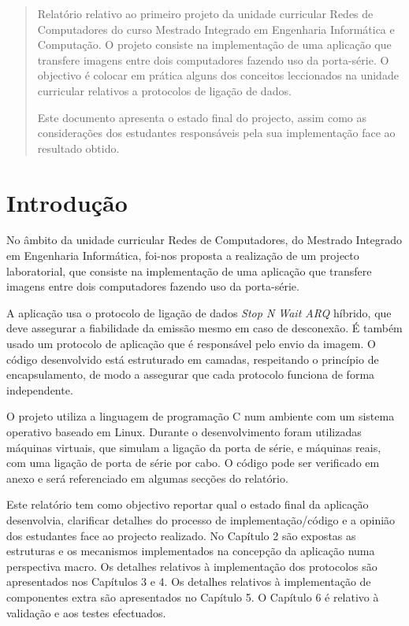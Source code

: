 \documentclass[11pt,a4paper,reqno]{report}
\numberwithin{equation}{section}
\begin{document}



\begin{abstract}
	
Relatório relativo ao primeiro projeto da unidade curricular Redes de Computadores do curso Mestrado Integrado em Engenharia Informática e Computação. O projeto consiste na implementação de uma aplicação que transfere imagens entre dois computadores fazendo uso da porta-série. O objectivo é colocar em prática alguns dos conceitos leccionados na unidade curricular relativos a protocolos de ligação de dados.

Este documento apresenta o estado final do projecto, assim como as considerações dos estudantes responsáveis pela sua implementação face ao resultado obtido.

\end{abstract}

\tableofcontents

\chapter{Introdução}

No âmbito da unidade curricular Redes de Computadores, do Mestrado Integrado em Engenharia Informática, foi-nos proposta a realização de um projecto laboratorial, que consiste na implementação de uma aplicação que transfere imagens entre dois computadores fazendo uso da porta-série. 

A aplicação usa o protocolo de ligação de dados \emph{Stop N Wait ARQ} híbrido, que deve assegurar a fiabilidade  da emissão mesmo em caso de desconexão. É também usado um protocolo de aplicação que é responsável pelo envio da imagem. O código desenvolvido está estruturado em camadas, respeitando o princípio de encapsulamento, de modo a assegurar que cada protocolo funciona de forma independente.
	
O projeto utiliza a linguagem de programação C num ambiente com um sistema operativo baseado em Linux. Durante o desenvolvimento foram utilizadas máquinas virtuais, que simulam a ligação da porta de série, e máquinas reais, com uma ligação de porta de série por cabo. O código pode ser verificado em anexo e será referenciado em algumas secções do relatório.
	
Este relatório tem como objectivo reportar qual o estado final da aplicação desenvolvia, clarificar detalhes do processo de implementação/código e a opinião dos estudantes face ao projecto realizado. No Capítulo 2 são expostas as estruturas e os mecanismos implementados na concepção da aplicação numa perspectiva macro. Os detalhes relativos à implementação dos protocolos são apresentados nos Capítulos 3 e 4. Os detalhes relativos à implementação de componentes extra são apresentados no Capítulo 5. O Capítulo 6 é relativo à validação e aos testes efectuados.
	
\end{document}
